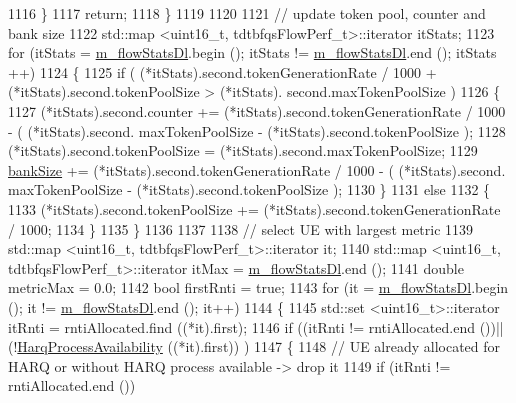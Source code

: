 \begin{DoxyCode}
1116         \}
1117       \textcolor{keywordflow}{return};
1118     \}
1119 
1120 
1121   \textcolor{comment}{// update token pool, counter and bank size}
1122   std::map <uint16\_t, tdtbfqsFlowPerf\_t>::iterator itStats;
1123   \textcolor{keywordflow}{for} (itStats = \hyperlink{classns3_1_1TdTbfqFfMacScheduler_a077474dfdd0b794b6e274954e049e0c4}{m\_flowStatsDl}.begin (); itStats != \hyperlink{classns3_1_1TdTbfqFfMacScheduler_a077474dfdd0b794b6e274954e049e0c4}{m\_flowStatsDl}.end (); itStats
      ++)
1124     \{
1125       \textcolor{keywordflow}{if} ( (*itStats).second.tokenGenerationRate / 1000 +  (*itStats).second.tokenPoolSize > (*itStats).
      second.maxTokenPoolSize )     
1126         \{
1127           (*itStats).second.counter +=  (*itStats).second.tokenGenerationRate / 1000 - ( (*itStats).second.
      maxTokenPoolSize -  (*itStats).second.tokenPoolSize );
1128           (*itStats).second.tokenPoolSize = (*itStats).second.maxTokenPoolSize;
1129           \hyperlink{classns3_1_1TdTbfqFfMacScheduler_af215332201b187b2699413c222d0c88d}{bankSize} += (*itStats).second.tokenGenerationRate / 1000 - ( (*itStats).second.
      maxTokenPoolSize -  (*itStats).second.tokenPoolSize );
1130         \}
1131       \textcolor{keywordflow}{else}
1132         \{
1133           (*itStats).second.tokenPoolSize += (*itStats).second.tokenGenerationRate / 1000;
1134         \}
1135     \}
1136 
1137 
1138   \textcolor{comment}{// select UE with largest metric}
1139   std::map <uint16\_t, tdtbfqsFlowPerf\_t>::iterator it;
1140   std::map <uint16\_t, tdtbfqsFlowPerf\_t>::iterator itMax = \hyperlink{classns3_1_1TdTbfqFfMacScheduler_a077474dfdd0b794b6e274954e049e0c4}{m\_flowStatsDl}.end ();
1141   \textcolor{keywordtype}{double} metricMax = 0.0;
1142   \textcolor{keywordtype}{bool} firstRnti = \textcolor{keyword}{true};
1143   \textcolor{keywordflow}{for} (it = \hyperlink{classns3_1_1TdTbfqFfMacScheduler_a077474dfdd0b794b6e274954e049e0c4}{m\_flowStatsDl}.begin (); it != \hyperlink{classns3_1_1TdTbfqFfMacScheduler_a077474dfdd0b794b6e274954e049e0c4}{m\_flowStatsDl}.end (); it++)
1144     \{
1145       std::set <uint16\_t>::iterator itRnti = rntiAllocated.find ((*it).first);
1146       \textcolor{keywordflow}{if} ((itRnti != rntiAllocated.end ())||(!\hyperlink{classns3_1_1TdTbfqFfMacScheduler_a6df3d860dc847dfa118d87b4a3679c7e}{HarqProcessAvailability} ((*it).first))
      )
1147         \{
1148           \textcolor{comment}{// UE already allocated for HARQ or without HARQ process available -> drop it}
1149           \textcolor{keywordflow}{if} (itRnti != rntiAllocated.end ())

\end{DoxyCode}

